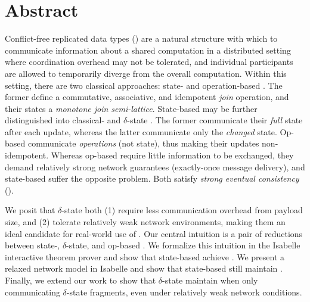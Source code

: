\chapter*{Abstract}

Conflict-free replicated data types (\CRDTs) are a natural structure with which
to communicate information about a shared computation in a distributed setting
where coordination overhead may not be tolerated, and individual participants
are allowed to temporarily diverge from the overall computation.  Within this
setting, there are two classical approaches: state- and operation-based \CRDTs.
The former define a commutative, associative, and idempotent \textit{join}
operation, and their states a \textit{monotone join semi-lattice}. State-based
\CRDTs may be further distinguished into classical- and $\delta$-state \CRDTs.
The former communicate their \emph{full} state after each update, whereas the
latter communicate only the \emph{changed} state. Op-based \CRDTs communicate
\emph{operations} (not state), thus making their updates non-idempotent.
Whereas op-based \CRDTs require little information to be exchanged, they demand
relatively strong network guarantees (exactly-once message delivery), and
state-based \CRDTs suffer the opposite problem. Both satisfy \textit{strong
eventual consistency} (\SEC).

We posit that $\delta$-state \CRDTs both (1) require less communication overhead
from payload size, and (2) tolerate relatively weak network environments, making
them an ideal candidate for real-world use of \CRDTs. Our central intuition is a
pair of reductions between state-, $\delta$-state, and op-based \CRDTs. We
formalize this intuition in the Isabelle interactive theorem prover and show
that state-based \CRDTs achieve \SEC. We present a relaxed network model in
Isabelle and show that state-based \CRDTs still maintain \SEC. Finally, we
extend our work to show that $\delta$-state \CRDTs maintain \SEC when only
communicating $\delta$-state fragments, even under relatively weak network
conditions.
